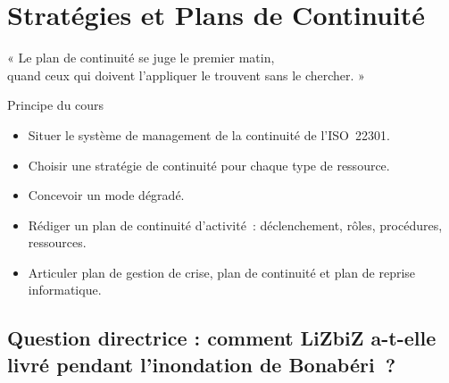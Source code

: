 
\chapter{Stratégies et Plans de Continuité}
\label{chap:pca}

\epigraph{%
    « Le plan de continuité se juge le premier matin,\\
    quand ceux qui doivent l'appliquer le trouvent sans le chercher. »%
}{Principe du cours}


\begin{boxobjectifs}
\begin{itemize}
    \item Situer le système de management de la continuité de
          l'ISO~22301.
    \item Choisir une stratégie de continuité pour chaque type de
          ressource.
    \item Concevoir un mode dégradé.
    \item Rédiger un plan de continuité d'activité~: déclenchement, rôles,
          procédures, ressources.
    \item Articuler plan de gestion de crise, plan de continuité et plan de
          reprise informatique.
\end{itemize}
\end{boxobjectifs}

\bigskip

\section*{Question directrice : comment LiZbiZ a-t-elle livré pendant l'inondation de Bonabéri~?}

